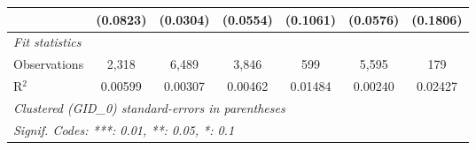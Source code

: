 \begin{table}[H]
\begin{tabular}{lcccccc}
                                         & (0.0823)    & (0.0304)       & (0.0554)       & (0.1061)       & (0.0576)       & (0.1806)\\   
      \midrule
      \emph{Fit statistics}\\
      Observations                       & 2,318       & 6,489          & 3,846          & 599            & 5,595          & 179\\  
      R$^2$                              & 0.00599     & 0.00307        & 0.00462        & 0.01484        & 0.00240        & 0.02427\\  
      \midrule \midrule
      \multicolumn{7}{l}{\emph{Clustered (GID\_0) standard-errors in parentheses}}\\
      \multicolumn{7}{l}{\emph{Signif. Codes: ***: 0.01, **: 0.05, *: 0.1}}\\
   \end{tabular}
\end{table}



